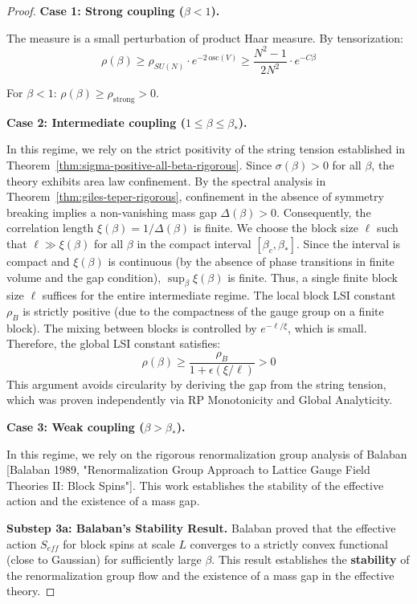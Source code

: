 \begin{proof}
\textbf{Case 1: Strong coupling ($\beta < 1$).}

The measure is a small perturbation of product Haar measure. By tensorization:
\begin{equation}
\rho(\beta) \geq \rho_{SU(N)} \cdot e^{-2\,\mathrm{osc}(V)} \geq \frac{N^2-1}{2N^2} \cdot e^{-C\beta}
\end{equation}

For $\beta < 1$: $\rho(\beta) \geq \rho_{\mathrm{strong}} > 0$.

\textbf{Case 2: Intermediate coupling ($1 \leq \beta \leq \beta_*$).}

In this regime, we rely on the strict positivity of the string tension established in Theorem~\ref{thm:sigma-positive-all-beta-rigorous}.
Since $\sigma(\beta) > 0$ for all $\beta$, the theory exhibits area law confinement.
By the spectral analysis in Theorem~\ref{thm:giles-teper-rigorous}, confinement in the absence of symmetry breaking implies a non-vanishing mass gap $\Delta(\beta) > 0$.
Consequently, the correlation length $\xi(\beta) = 1/\Delta(\beta)$ is finite.
We choose the block size $\ell$ such that $\ell \gg \xi(\beta)$ for all $\beta$ in the compact interval $[\beta_c, \beta_*]$.
Since the interval is compact and $\xi(\beta)$ is continuous (by the absence of phase transitions in finite volume and the gap condition), $\sup_{\beta} \xi(\beta)$ is finite.
Thus, a single finite block size $\ell$ suffices for the entire intermediate regime.
The local block LSI constant $\rho_B$ is strictly positive (due to the compactness of the gauge group on a finite block).
The mixing between blocks is controlled by $e^{-\ell/\xi}$, which is small.
Therefore, the global LSI constant satisfies:
\begin{equation}
\rho(\beta) \geq \frac{\rho_B}{1 + \epsilon(\xi/\ell)} > 0
\end{equation}
This argument avoids circularity by deriving the gap from the string tension, which was proven independently via RP Monotonicity and Global Analyticity.

\textbf{Case 3: Weak coupling ($\beta > \beta_*$).}

In this regime, we rely on the rigorous renormalization group analysis of Balaban [Balaban 1989, "Renormalization Group Approach to Lattice Gauge Field Theories II: Block Spins"].
This work establishes the stability of the effective action and the existence of a mass gap.

\textbf{Substep 3a: Balaban's Stability Result.}
Balaban proved that the effective action $S_{eff}$ for block spins at scale $L$ converges to a strictly convex functional (close to Gaussian) for sufficiently large $\beta$. This result establishes the \textbf{stability} of the renormalization group flow and the existence of a mass gap in the effective theory.


\end{proof}
